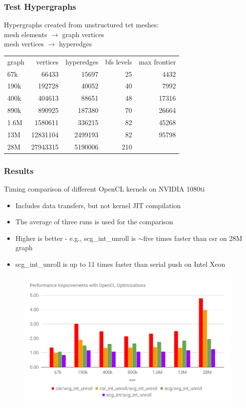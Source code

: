 \documentclass{beamer}
\begin{document}
\begin{frame}
  \frametitle{Test Hypergraphs}
  Hypergraphs created from unstructured tet meshes: \\
  mesh elements $\rightarrow$ graph vertices \\
  mesh vertices $\rightarrow$ hyperedges
  \begin{table}[]
    \centering
    \label{my-label}
    \begin{tabular}{lrrrr}
      graph & vertices & hyperedges & bfs levels & max frontier  \\
      67k   & 66433    & 15697      & 25         & 4432          \\
      190k  & 192728   & 40052      & 40         & 7992          \\
      400k  & 404613   & 88651      & 48         & 17316         \\
      890k  & 890925   & 187380     & 70         & 26664         \\
      1.6M  & 1580611  & 336215     & 82         & 45268         \\
      13M   & 12831104 & 2499193    & 82         & 95798         \\
      28M   & 27943315 & 5190006    & 210        &
    \end{tabular}
  \end{table}
\end{frame}

\begin{frame}
  \frametitle{Results}
  Timing comparison of different OpenCL kernels on NVIDIA 1080ti
  \begin{itemize}
    \item Includes data transfers, but not kernel JIT compilation
    \item The average of three runs is used for the comparison
    \item Higher is better - e.g., scg\_int\_unroll is $\sim$five times faster than csr on 28M graph
    \item scg\_int\_unroll is up to 11 times faster than serial push on Intel Xeon
  \end{itemize}
  \begin{figure}
    \centering
    \includegraphics[width=.7\textwidth]{results/bfsNoPush.png}
  \end{figure}  
\end{frame}
\end{document}
